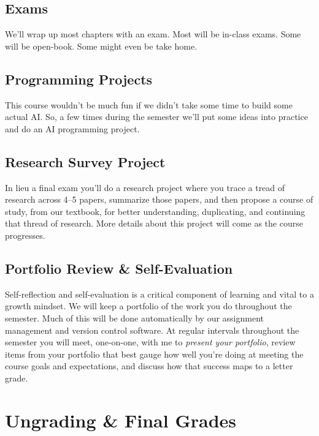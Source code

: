 \documentclass[10pt]{article}
\begin{document}
\subsection*{Exams}

We'll wrap up most chapters with an exam. Most will be in-class exams. Some will be open-book. Some might even be take home. 

\subsection*{Programming Projects}

This course wouldn't be much fun if we didn't take some time to build some actual AI.  So, a few times during the semester we'll put some ideas into practice and do an AI programming project. 

\subsection*{Research Survey Project}

In lieu a final exam you'll do a research project where you trace a tread of research across 4--5 papers, summarize those papers, and then propose a course of study, from our textbook, for better understanding, duplicating, and continuing that thread of research. More details about this project will come as the course progresses. 

\subsection*{Portfolio Review \& Self-Evaluation}

Self-reflection and self-evaluation is a critical component of learning and vital to a growth mindset. We will keep a portfolio of the work you do throughout the semester. Much of this will be done automatically by our assignment management and version control software. At regular intervals throughout the semester you will meet, one-on-one, with me to \textit{present your portfolio}, review items from your portfolio that best gauge how well you're doing at meeting the course goals and expectations, and discuss how that success maps to a letter grade.  



\section{Ungrading \& Final Grades}
\end{document}
